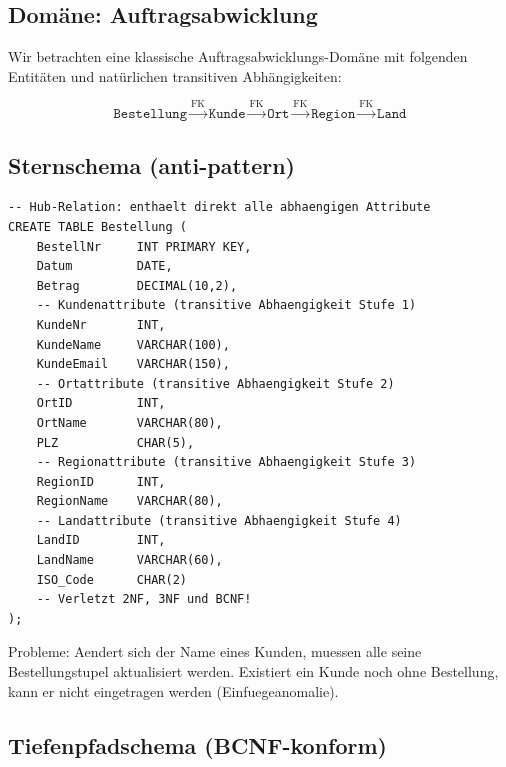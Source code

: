 ﻿\documentclass[12pt,a4paper]{article}
\theoremstyle{definition}
\theoremstyle{remark}
\begin{document}
\subsection{Domäne: Auftragsabwicklung}

Wir betrachten eine klassische Auftragsabwicklungs-Domäne mit folgenden
Entitäten und natürlichen transitiven Abhängigkeiten:

\[
  \texttt{Bestellung} \xrightarrow{\text{FK}} \texttt{Kunde}
  \xrightarrow{\text{FK}} \texttt{Ort}
  \xrightarrow{\text{FK}} \texttt{Region}
  \xrightarrow{\text{FK}} \texttt{Land}
\]

\subsection{Sternschema (anti-pattern)}

\begin{lstlisting}[caption={Anti-Pattern: Sternschema mit denormalisierten Attributen in Hub-Relation},label=lst:stern]
-- Hub-Relation: enthaelt direkt alle abhaengigen Attribute
CREATE TABLE Bestellung (
    BestellNr     INT PRIMARY KEY,
    Datum         DATE,
    Betrag        DECIMAL(10,2),
    -- Kundenattribute (transitive Abhaengigkeit Stufe 1)
    KundeNr       INT,
    KundeName     VARCHAR(100),
    KundeEmail    VARCHAR(150),
    -- Ortattribute (transitive Abhaengigkeit Stufe 2)
    OrtID         INT,
    OrtName       VARCHAR(80),
    PLZ           CHAR(5),
    -- Regionattribute (transitive Abhaengigkeit Stufe 3)
    RegionID      INT,
    RegionName    VARCHAR(80),
    -- Landattribute (transitive Abhaengigkeit Stufe 4)
    LandID        INT,
    LandName      VARCHAR(60),
    ISO_Code      CHAR(2)
    -- Verletzt 2NF, 3NF und BCNF!
);
\end{lstlisting}

Probleme: Aendert sich der Name eines Kunden, muessen alle seine
Bestellungstupel aktualisiert werden. Existiert ein Kunde noch ohne
Bestellung, kann er nicht eingetragen werden (Einfuegeanomalie).

\subsection{Tiefenpfadschema (BCNF-konform)}
\end{document}
